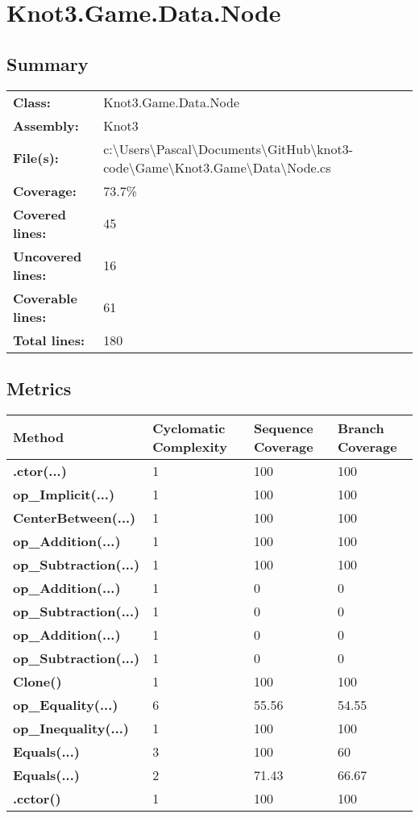 \documentclass[a4paper,10pt]{article}
\begin{document}
\section{Knot3.Game.Data.Node}
\subsection{Summary}
\begin{longtable}[l]{ll}
\textbf{Class:} & Knot3.Game.Data.Node\\
\textbf{Assembly:} & Knot3\\
\textbf{File(s):} & \begin{minipage}[t]{12cm}{c:\textbackslash Users\textbackslash Pascal\textbackslash Documents\textbackslash GitHub\textbackslash knot3-code\textbackslash Game\textbackslash Knot3.Game\textbackslash Data\textbackslash Node.cs}\end{minipage} \\
\textbf{Coverage:} & 73.7\%\\
\textbf{Covered lines:} & 45\\
\textbf{Uncovered lines:} & 16\\
\textbf{Coverable lines:} & 61\\
\textbf{Total lines:} & 180\\
\end{longtable}
\subsection{Metrics}
\begin{longtable}[l]{|l|l|l|l|}
\hline
\textbf{Method} & \textbf{Cyclomatic Complexity} & \textbf{Sequence Coverage} & \textbf{Branch Coverage}\\
\hline
\textbf{.ctor(...)} & 1 & 100 & 100\\
\hline
\textbf{op\_Implicit(...)} & 1 & 100 & 100\\
\hline
\textbf{CenterBetween(...)} & 1 & 100 & 100\\
\hline
\textbf{op\_Addition(...)} & 1 & 100 & 100\\
\hline
\textbf{op\_Subtraction(...)} & 1 & 100 & 100\\
\hline
\textbf{op\_Addition(...)} & 1 & 0 & 0\\
\hline
\textbf{op\_Subtraction(...)} & 1 & 0 & 0\\
\hline
\textbf{op\_Addition(...)} & 1 & 0 & 0\\
\hline
\textbf{op\_Subtraction(...)} & 1 & 0 & 0\\
\hline
\textbf{Clone()} & 1 & 100 & 100\\
\hline
\textbf{op\_Equality(...)} & 6 & 55.56 & 54.55\\
\hline
\textbf{op\_Inequality(...)} & 1 & 100 & 100\\
\hline
\textbf{Equals(...)} & 3 & 100 & 60\\
\hline
\textbf{Equals(...)} & 2 & 71.43 & 66.67\\
\hline
\textbf{.cctor()} & 1 & 100 & 100\\
\hline
\end{longtable}
\end{document}
